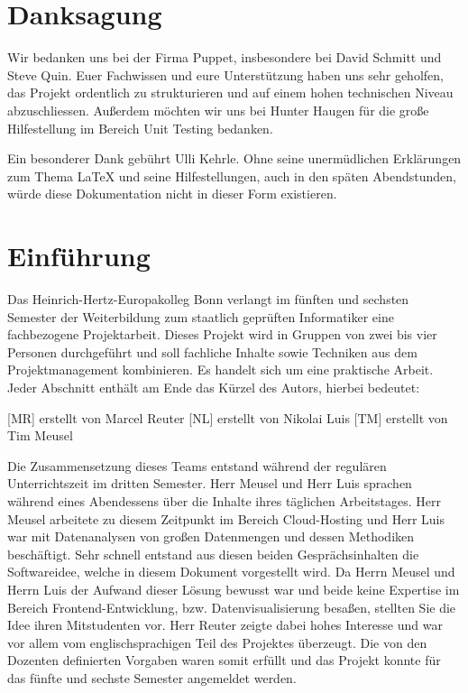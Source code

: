 \chapter*{Danksagung}
Wir bedanken uns bei der Firma Puppet, insbesondere bei David Schmitt und Steve
Quin. Euer Fachwissen und eure Unterstützung haben uns sehr geholfen, das
Projekt ordentlich zu strukturieren und auf einem hohen technischen Niveau
abzuschliessen. Außerdem möchten wir uns bei Hunter Haugen für die
große Hilfestellung im Bereich Unit Testing bedanken.

Ein besonderer Dank gebührt Ulli Kehrle. Ohne seine unermüdlichen Erklärungen
zum Thema \LaTeX{} und seine Hilfestellungen, auch in den späten Abendstunden,
würde diese Dokumentation nicht in dieser Form existieren.

\newpage

\tableofcontents
\listoffigures
\begingroup
\let\clearpage\relax
\lstlistoflistings{}
\listoftables
\endgroup

\chapter{Einführung}
\label{chap:einfuehrung}
Das Heinrich-Hertz-Europakolleg Bonn verlangt im fünften und sechsten Semester
der Weiterbildung zum staatlich geprüften Informatiker eine fachbezogene
Projektarbeit. Dieses Projekt wird in Gruppen von zwei bis vier Personen
durchgeführt und soll fachliche Inhalte sowie Techniken aus dem
Projektmanagement kombinieren. Es handelt sich um eine praktische Arbeit. Jeder
Abschnitt enthält am Ende das Kürzel des Autors, hierbei bedeutet:

\begin{outline}
  \1 {[MR]} erstellt von Marcel Reuter
  \1 {[NL]} erstellt von Nikolai Luis
  \1 {[TM]} erstellt von Tim Meusel
\end{outline}

Die Zusammensetzung dieses Teams entstand während der regulären Unterrichtszeit
im dritten Semester. Herr Meusel und Herr Luis sprachen während eines
Abendessens über die Inhalte ihres täglichen Arbeitstages. Herr Meusel
arbeitete zu diesem Zeitpunkt im Bereich Cloud-Hosting und Herr Luis war mit
Datenanalysen von großen Datenmengen und dessen Methodiken beschäftigt. Sehr
schnell entstand aus diesen beiden Gesprächsinhalten die Softwareidee, welche
in diesem Dokument vorgestellt wird. Da Herrn Meusel und Herrn Luis der Aufwand
dieser Lösung bewusst war und beide keine Expertise im Bereich
Frontend-Entwicklung, bzw. Datenvisualisierung besaßen, stellten Sie die Idee
ihren Mitstudenten vor. Herr Reuter zeigte dabei hohes Interesse und war vor
allem vom englischsprachigen Teil des Projektes überzeugt. Die von den Dozenten
definierten Vorgaben waren somit erfüllt und das Projekt konnte für das fünfte
und sechste Semester angemeldet werden.

